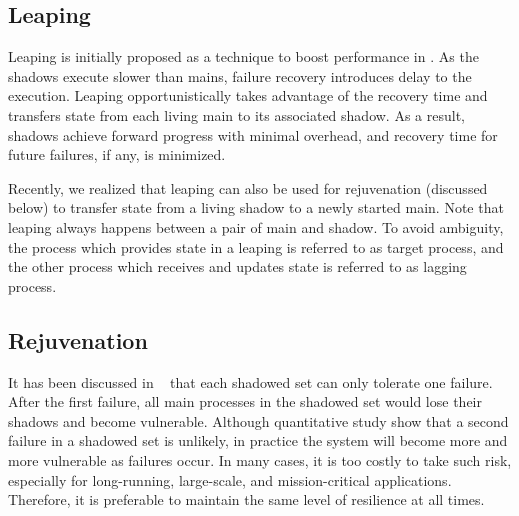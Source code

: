 \subsection{Leaping}

Leaping is initially proposed as a technique to boost performance in \cite{cui_2016_scalcom}. As the shadows execute slower than mains, failure recovery introduces delay to the execution. Leaping opportunistically takes advantage of the recovery time and transfers state from each living main to its associated shadow. As a result, shadows achieve forward progress with minimal overhead, and recovery time for future failures, if any, is minimized. 

Recently, we realized that leaping can also be used for rejuvenation (discussed below) to transfer state from a living shadow to a newly started main. Note that leaping always happens between a pair of main and shadow. To avoid ambiguity, the process which provides state in a leaping is referred to as target process, and the other process which receives and updates state is referred to as lagging process. 


\subsection{Rejuvenation}

It has been discussed in ~\cite{cui_2016_scalcom} that each shadowed set can only tolerate one failure. After the first failure, all main processes in the shadowed set would lose their shadows and become vulnerable. Although quantitative study show that a second failure in a shadowed set is unlikely, %
in practice the system will become more and more vulnerable as failures occur. In many cases, it is too costly to take such risk, especially for long-running, large-scale, and mission-critical applications. Therefore, it is preferable to maintain the same level of resilience at all times.

